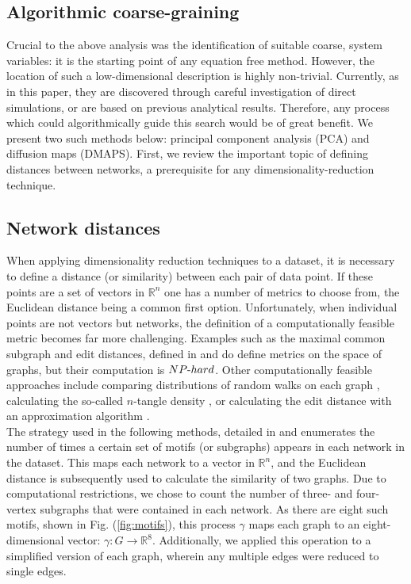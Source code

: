 \documentclass[epjST, final]{svjour}
\begin{document}
\begin{onehalfspace}
\section{Algorithmic coarse-graining}
\label{sec:dr}
Crucial to the above analysis was the identification of suitable coarse, system variables: it is the starting point of any equation free method. However, the location of such a low-dimensional description is highly non-trivial. Currently, as in this paper, they are discovered through careful investigation of direct simulations, or are based on previous analytical results. Therefore, any process which could algorithmically guide this search would be of great benefit. We present two such methods below: principal component analysis (PCA) and diffusion maps (DMAPS). First, we review the important topic of defining distances between networks, a prerequisite for any dimensionality-reduction technique.

\subsection{Network distances}

When applying dimensionality reduction techniques to a dataset, it is
necessary to define a distance (or similarity) between each pair of
data point. If these points are a set of vectors in $\mathbb{R}^n$ one
has a number of metrics to choose from, the Euclidean distance being a
common first option. Unfortunately, when individual points are not
vectors but networks, the definition of a computationally feasible
metric becomes far more challenging. Examples such as the maximal
common subgraph and edit distances, defined in \cite{bunke_graph_1998}
and \cite{gao_survey_2010} do define metrics on the space of graphs,
but their computation is $NP\textnormal{-}hard$. Other computationally
feasible approaches include comparing distributions of random
walks on each graph \cite{vishwanathan_graph_2010}, calculating the so-called
$n$-tangle density \cite{gallos_revealing_2014}, or calculating the edit distance
with an approximation algorithm \cite{riesen_approximate_2009,zeng_comparing_2009}.  \\

The strategy used in the following methods, detailed in
\cite{rajendran_analysis_2013} and \cite{xiao_structure-based_2008}
enumerates the number of times a certain set of motifs (or subgraphs)
appears in each network in the dataset. This maps each network to a
vector in $\mathbb{R}^n$, and the Euclidean distance is subsequently
used to calculate the similarity of two graphs. Due to computational
restrictions, we chose to count the number of three- and four-vertex
subgraphs that were contained in each network. As there are eight such
motifs, shown in Fig. (\ref{fig:motifs}), this process $\gamma$ maps
each graph to an eight-dimensional vector:
$\gamma : G \rightarrow \mathbb{R}^8$. Additionally, we applied this
operation to a simplified version of each graph, wherein any
multiple edges were reduced to single edges.


\end{onehalfspace}
\end{document}
